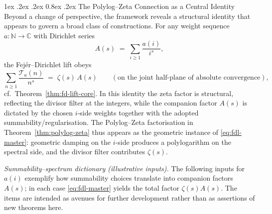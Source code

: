 \documentclass[11pt,a4paper]{amsart}
\makeatletter
\renewcommand\paragraph{\@startsection{paragraph}{4}{\z@}%
  {1ex \@plus .2ex \@minus .2ex}%
  {0.8ex \@plus .2ex}%
  {\normalfont\bfseries}}
\theoremstyle{plain}
\theoremstyle{definition}
\theoremstyle{remark}
\makeatother
\begin{document}
\paragraph{The Polylog--Zeta Connection as a Central Identity}
Beyond a change of perspective, the framework reveals a structural identity that appears to govern a broad class of constructions. For any weight sequence $a:\mathbb N\to\mathbb C$ with Dirichlet series
\[
A(s)\;=\;\sum_{i\ge1}\frac{a(i)}{i^s},
\]
the Fej\'er--Dirichlet lift obeys
\begin{equation}\label{eq:fdl-master}
\sum_{n\ge1}\frac{\mathcal T_a(n)}{n^s}\;=\;\zeta(s)\,A(s)
\qquad(\text{on the joint half-plane of absolute convergence}),
\end{equation}
cf.\ Theorem~\ref{thm:fd-lift-core}. In this identity the zeta factor is structural, reflecting the divisor filter at the integers, while the companion factor $A(s)$ is dictated by the chosen $i$-side weights together with the adopted summability/regularisation. The Polylog--Zeta factorisation in Theorem~\ref{thm:polylog-zeta} thus appears as the geometric instance of \eqref{eq:fdl-master}: geometric damping on the $i$-side produces a polylogarithm on the spectral side, and the divisor filter contributes $\zeta(s)$.

\medskip
\noindent\emph{Summability--spectrum dictionary (illustrative inputs).}
The following inputs for $a(i)$ exemplify how summability choices translate into companion factors $A(s)$; in each case \eqref{eq:fdl-master} yields the total factor $\zeta(s)A(s)$. The items are intended as avenues for further development rather than as assertions of new theorems here.
\end{document}
